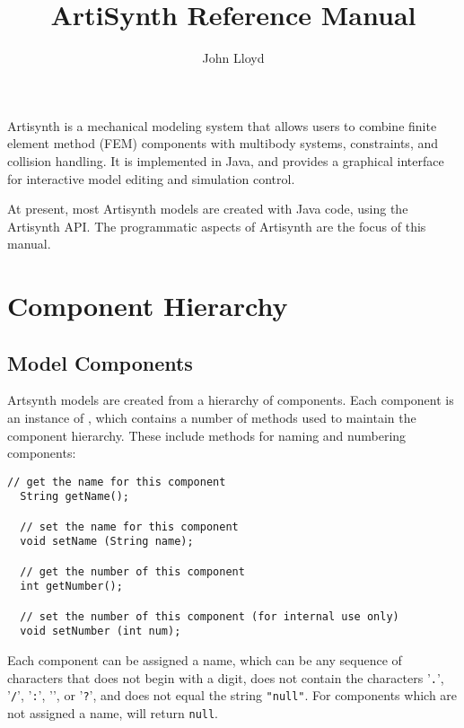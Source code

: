 \documentclass{article}
\title{ArtiSynth Reference Manual}
\author{John Lloyd}
\date{}
\begin{document}
\maketitle

\iflatexml{\large\pubdate}\fi

\tableofcontents

Artisynth is a mechanical modeling system that allows users to combine
finite element method (FEM) components with multibody systems,
constraints, and collision handling. It is implemented in Java, and
provides a graphical interface for interactive model editing and
simulation control.

At present, most Artisynth models are created with Java code, using the
Artisynth API. The programmatic aspects of Artisynth are the focus of
this manual.

\section{Component Hierarchy}
\label{ComponentHierarchy}

\subsection{Model Components}

Artsynth models are created from a hierarchy of components. Each
component is an instance of
, which contains a
number of methods used to maintain the component hierarchy.  These
include methods for naming and numbering components:

\begin{lstlisting}[]
  // get the name for this component
  String getName();

  // set the name for this component
  void setName (String name);

  // get the number of this component
  int getNumber();

  // set the number of this component (for internal use only)
  void setNumber (int num);
\end{lstlisting}

Each component can be assigned a name, which can be any sequence of
characters that does not begin with a digit, does not contain the
characters '{\tt .}', '{\tt /}', '{\tt :}', '{\tt *}', or '{\tt ?}',
and does not equal the string {\tt "null"}.
For components which are not assigned a name,
will return {\tt null}.
\end{document}
